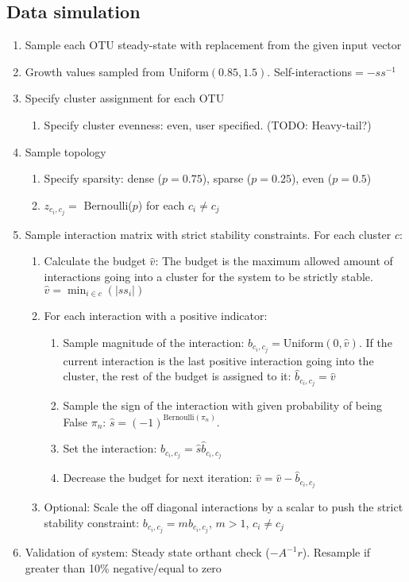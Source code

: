 \documentclass{article}
\newcommand{\Bernoullidist}{\text{Bernoulli}}
\newcommand{\Uniformdist}{\text{Uniform}}
\begin{document}
  \subsection{Data simulation}
  \label{subsection:data simulation}
  \begin{enumerate}
  	\item Sample each OTU steady-state with replacement from the given input vector
  	\item Growth values sampled from $\Uniformdist(0.85, 1.5)$. Self-interactions$=-ss^{-1}$
  	\item Specify cluster assignment for each OTU
  	\begin{enumerate}
  		\item Specify cluster evenness: even, user specified. (TODO: Heavy-tail?)
  	\end{enumerate}
  	\item Sample topology
  		\begin{enumerate}
  			\item Specify sparsity: dense ($p=0.75$), sparse ($p=0.25$), even ($p=0.5$)
  			\item $z_{c_i, c_j}=$ Bernoulli($p$) for each $c_i \neq c_j$
  		\end{enumerate}
  	\item Sample interaction matrix with strict stability constraints. For each cluster $c$:
  	\begin{enumerate}
      \item Calculate the budget $\hat{v}$: The budget is the maximum allowed amount of interactions going into a cluster for the system to be strictly stable. $\hat{v} = \min_{i \in c}(|ss_i|)$
      \item For each interaction with a positive indicator:
        \begin{enumerate}
          \item Sample magnitude of the interaction: $\hat{b}_{c_i,c_j} = \Uniformdist(0, \hat{v})$. If the current interaction is the last positive  interaction going into the cluster, the rest of the budget is assigned to it: $\hat{b}_{c_i,c_j} = \hat{v}$
          \item Sample the sign of the interaction with given probability of being False $\pi_n$: $\hat{s} = (-1)^{\Bernoullidist(\pi_n)}$.
          \item Set the interaction: $b_{c_i,c_j} = \hat{s} \hat{b}_{c_i,c_j}$
          \item Decrease the budget for next iteration: $\hat{v} = \hat{v}-\hat{b}_{c_i,c_j}$
        \end{enumerate}
  		\item Optional: Scale the off diagonal interactions by a scalar to push the strict stability constraint: $b_{c_i,c_j} = m  b_{c_i,c_j}$, $m > 1$, $c_i \neq c_j$
  	\end{enumerate}
  	\item Validation of system: Steady state orthant check ($-A^{-1}r$). Resample if greater than 10\% negative/equal to zero
  \end{enumerate}
\end{document}
